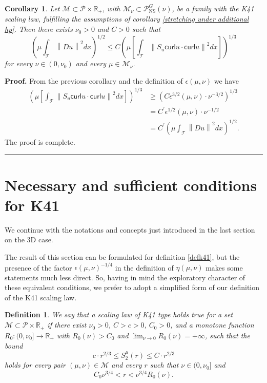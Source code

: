 \documentclass[11pt]{preprint}
\newtheorem{corollary}[theorem]{Corollary}
\newtheorem{definition}[theorem]{Definition}
\newenvironment{proof}[1][Proof]{\textbf{#1.} }{\ \rule{0.5em}{0.5em}}
\begin{document}
\begin{corollary}
\label{3Dsecondcorollary}Let $\mathcal{M}\subset\mathcal{P}\times
\mathbb{R}_{+}$, with $\mathcal{M}_{\nu}\subset\mathcal{P}_{{\mathrm{NS}}}%
^{G}\left(  \nu\right)  $, be a family with the K41 scaling law, fulfilling
the assumptions of corollary \ref{stretching under additional hp}. Then there
exists $\nu_{0}>0$ and $C>0$ such that
\[
\left(  \mu\int_{\mathcal{T}}\left\|  Du\right\|  ^{2}dx\right)  ^{1/2}\leq
C\left(  \mu\left[  \int_{\mathcal{T}}\left\|  S_{u}\mathsf{curl}%
u\cdot\mathsf{curl}u\right\|  ^{2}dx\right]  \right)  ^{1/3}%
\]
for every $\nu\in\left(  0,\nu_{0}\right)  $ and every $\mu\in\mathcal{M}%
_{\nu}$.
\end{corollary}

\begin{proof}
From the previous corollary and the definition of $\epsilon\left(  \mu
,\nu\right)  $ we have
\begin{align*}
\left(  \mu\left[  \int_{\mathcal{T}}\left\|  S_{u}\mathsf{curl}%
u\cdot\mathsf{curl}u\right\|  ^{2}dx\right]  \right)  ^{1/3} &  \geq\left(
C\epsilon^{3/2}\left(  \mu,\nu\right)  \cdot\nu^{-3/2}\right)  ^{1/3}\\
&  =C^{\prime}\epsilon^{1/2}\left(  \mu,\nu\right)  \cdot\nu^{-1/2}\\
&  =C^{\prime}\left(  \mu\int_{\mathcal{T}}\left\|  Du\right\|  ^{2}dx\right)
^{1/2}.
\end{align*}
The proof is complete.
\end{proof}



\section{Necessary and sufficient conditions for K41}
\label{sec:NecSuf}

We continue with the notations and concepts just introduced in the last
section on the 3D case.

The result of this section can be formulated for definition \ref{defk41}, but
the presence of the factor $\epsilon\left(  \mu,\nu\right)  ^{-1/4}$ in the
definition of $\eta\left(  \mu,\nu\right)  $ makes some statements much less
direct. So, having in mind the exploratory character of these equivalent
conditions, we prefer to adopt a simplified form of our definition of the K41 scaling law.

\begin{definition}
\label{defk41bis}We say that a scaling law of K41 type holds true for a set
$\mathcal{M}\subset\mathcal{P}\times\mathbb{R}_{+}$ if there exist $\nu_{0}%
>0$, $C>c>0$, $C_{0}>0$, and a monotone function $R_{0}\colon(0,\nu
_{0}]\rightarrow\mathbb{R}_{+}$ with $R_{0}\left(  \nu\right)  >C_{0}$ and
$\lim_{\nu\rightarrow0}R_{0}\left(  \nu\right)  =+\infty$, such that the
bound
\begin{equation}
c\cdot r^{2/3}\leq S_{2}^{\mu}\left(  r\right)  \leq C\cdot r^{2/3}%
\label{e:K41}%
\end{equation}
holds for every pair $(\mu,\nu)\in\mathcal{M}$ and every $r$ such that $\nu
\in(0,\nu_{0}]$ and
\[
C_{0}\nu^{3/4}<r<\nu^{3/4}R_{0}\left(  \nu\right)  .
\]
\end{definition}
\end{document}
